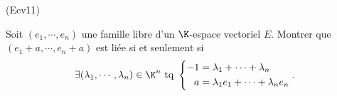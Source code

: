 \begin{tiny}(Eev11)\end{tiny} Soit $(e_1,\cdots,e_n)$ une famille libre d'un $\K$-espace vectoriel $E$. Montrer que $(e_1 + a, \cdots, e_n +a)$ est liée si et seulement si 
\[
\exists (\lambda_1,\cdots ,\lambda_n)\in \K^n \text{ tq }
\left\lbrace 
\begin{aligned}
 -1 &= \lambda_1 + \cdots + \lambda_n  \\ 
 a &= \lambda_1 e_1 + \cdots + \lambda_n e_n
\end{aligned}
\right. .
\]
